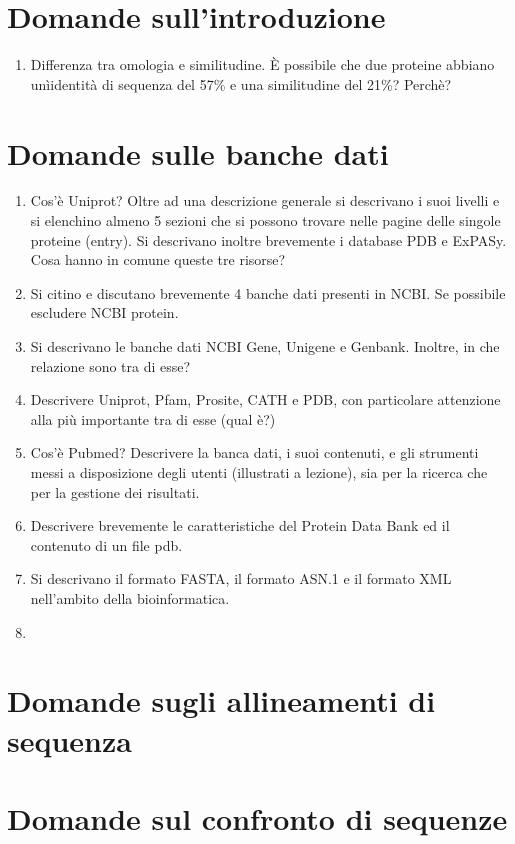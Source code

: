 \documentclass{article}
\begin{document}
\section{Domande sull'introduzione}
\Large
\begin{enumerate}
    \item Differenza tra omologia e similitudine. È possibile che due proteine abbiano unìidentità di sequenza del 57\% e una similitudine del 21\%? Perchè?
\end{enumerate}

\section{Domande sulle banche dati}
\begin{enumerate}
    \item Cos'è Uniprot? Oltre ad una descrizione generale si descrivano i suoi livelli e si elenchino almeno 5 sezioni che si possono trovare nelle pagine delle singole proteine (entry). Si descrivano inoltre brevemente i database PDB e ExPASy. Cosa hanno in comune queste tre risorse?
    \item Si citino e discutano brevemente 4 banche dati presenti in NCBI. Se possibile escludere NCBI protein.
    \item Si descrivano le banche dati NCBI Gene, Unigene e Genbank. Inoltre, in che relazione sono tra di esse?
    \item  Descrivere Uniprot, Pfam, Prosite, CATH e PDB, con particolare attenzione alla più importante tra di esse (qual è?)
    \item Cos'è Pubmed? Descrivere la banca dati, i suoi contenuti, e gli strumenti messi a disposizione degli utenti (illustrati a lezione), sia per la ricerca che per la gestione dei risultati.
    \item Descrivere brevemente le caratteristiche del Protein Data Bank ed il contenuto di un file pdb.
    \item Si descrivano il formato FASTA, il formato ASN.1 e il formato XML nell'ambito della bioinformatica.
    \item 
\end{enumerate}

\section{Domande sugli allineamenti di sequenza}

\section{Domande sul confronto di sequenze}
\end{document}
